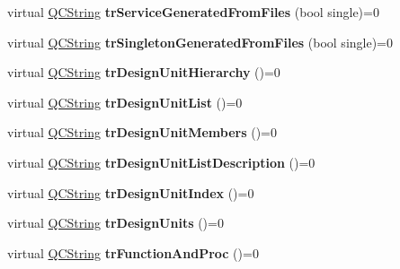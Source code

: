 \begin{DoxyCompactItemize}
\mbox{\label{class_translator_a2ac28449f8a213c58f9301f8ba23f3da}} 
virtual \mbox{\hyperlink{class_q_c_string}{Q\+C\+String}} {\bfseries tr\+Service\+Generated\+From\+Files} (bool single)=0
\item 
\mbox{\label{class_translator_a8d86724d12b9a4fc73a0a08ff1ebf3d1}} 
virtual \mbox{\hyperlink{class_q_c_string}{Q\+C\+String}} {\bfseries tr\+Singleton\+Generated\+From\+Files} (bool single)=0
\item 
\mbox{\label{class_translator_a6bb26b6125acf88344c8730be0fad254}} 
virtual \mbox{\hyperlink{class_q_c_string}{Q\+C\+String}} {\bfseries tr\+Design\+Unit\+Hierarchy} ()=0
\item 
\mbox{\label{class_translator_abf3c0bc07f3ccbe6748efbcd6fc906d9}} 
virtual \mbox{\hyperlink{class_q_c_string}{Q\+C\+String}} {\bfseries tr\+Design\+Unit\+List} ()=0
\item 
\mbox{\label{class_translator_af101667a891c464f4c72cf0ebd6aa529}} 
virtual \mbox{\hyperlink{class_q_c_string}{Q\+C\+String}} {\bfseries tr\+Design\+Unit\+Members} ()=0
\item 
\mbox{\label{class_translator_ab2b9472034c2443779998a45bb712c97}} 
virtual \mbox{\hyperlink{class_q_c_string}{Q\+C\+String}} {\bfseries tr\+Design\+Unit\+List\+Description} ()=0
\item 
\mbox{\label{class_translator_af7055b11742c82e166bf02d9189d70be}} 
virtual \mbox{\hyperlink{class_q_c_string}{Q\+C\+String}} {\bfseries tr\+Design\+Unit\+Index} ()=0
\item 
\mbox{\label{class_translator_af39391797c54dce9f530c4d77341b37b}} 
virtual \mbox{\hyperlink{class_q_c_string}{Q\+C\+String}} {\bfseries tr\+Design\+Units} ()=0
\item 
\mbox{\label{class_translator_a302e752086f5155ea1ffc689a91b3e57}} 
virtual \mbox{\hyperlink{class_q_c_string}{Q\+C\+String}} {\bfseries tr\+Function\+And\+Proc} ()=0
\item 
\mbox{\label{class_translator_a39d71540a7d5037f03c633fdcad785f6}} 

\end{DoxyCompactItemize}
